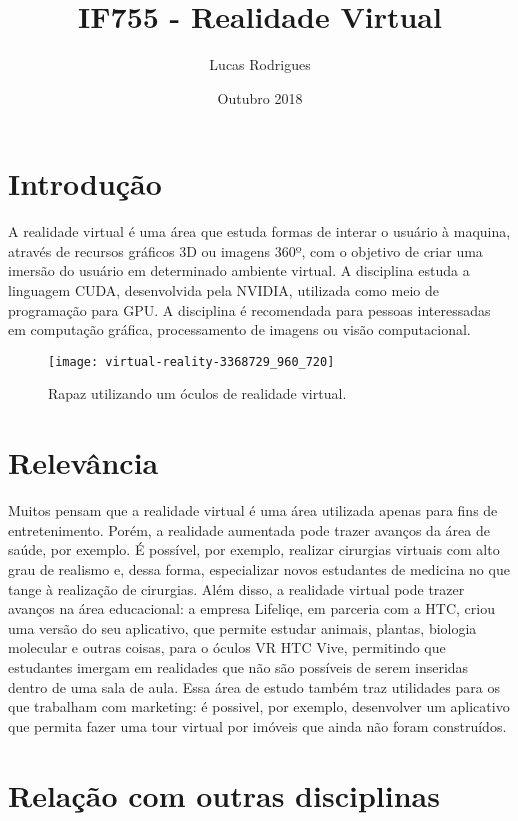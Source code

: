 \documentclass{article}
\title{IF755 - Realidade Virtual}
\author{Lucas Rodrigues}
\date{Outubro 2018}
\begin{document}
\maketitle

\section{Introdução}
A realidade virtual é uma área que estuda formas de interar o usuário à maquina, através de recursos gráficos 3D ou imagens 360º, com o objetivo de criar uma imersão do usuário em determinado ambiente virtual. A disciplina estuda a linguagem CUDA, desenvolvida pela NVIDIA, utilizada como meio de programação para GPU. A disciplina é recomendada para pessoas interessadas em computação gráfica, processamento de imagens ou visão computacional.

\begin{figure}[h!]
\centering
\texttt{[image: virtual-reality-3368729\_960\_720]}
\caption{Rapaz utilizando um óculos de realidade virtual. \citep{foto}} 
\label{fig:virtual-reality-3368729_960_720}
\end{figure}

\section{Relevância}
Muitos pensam que a realidade virtual é uma área utilizada apenas para fins de entretenimento. Porém, a realidade aumentada pode trazer avanços da área de saúde, por exemplo. É possível, por exemplo, realizar cirurgias virtuais com alto grau de realismo e, dessa forma, especializar novos estudantes de medicina no que tange à realização de cirurgias. Além disso, a realidade virtual pode trazer avanços na área educacional: a empresa Lifeliqe, em parceria com a HTC, criou uma versão do seu aplicativo, que permite estudar animais, plantas, biologia molecular e outras coisas, para o óculos VR HTC Vive, permitindo que estudantes imergam em realidades que não são possíveis de serem inseridas dentro de uma sala de aula. Essa área de estudo também traz utilidades para os que trabalham com marketing: é possivel, por exemplo, desenvolver um aplicativo que permita fazer uma tour virtual por imóveis que ainda não foram construídos. \citep{casamais}

\section{Relação com outras disciplinas}
\end{document}
